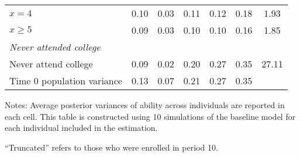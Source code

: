 \begin{table}[ht]
{\begin{threeparttable}
\begin{tabular}{lcccccc}
$x=4$&0.10&0.03&0.11&0.12&0.18&1.93 \\
$x\geq5$&0.09&0.03&0.10&0.10&0.16&1.85 \\
\midrule
\multicolumn{7}{l}{\emph{Never attended college}}\\
Never attend college&0.09&0.02&0.20&0.27&0.35&27.11 \\
\midrule
Time 0 population variance & 0.13 & 0.07 & 0.21 & 0.27 & 0.35 & \\
\bottomrule
\end{tabular}
\footnotesize Notes: Average posterior variances of ability across individuals are reported in each cell. This table is constructed using 10 simulations of the baseline model for each individual included in the estimation.

\medskip

``Truncated'' refers to those who were enrolled in period 10.
\end{threeparttable}
}
\end{table}
